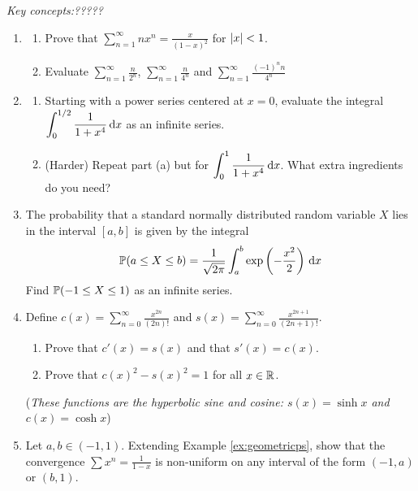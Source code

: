 \clearpage

\begin{exercises}
	\emph{Key concepts:\quad ?????}

	\begin{enumerate}
	  \item\begin{enumerate}
			\item Prove that $\displaystyle\sum_{n=1}^\infty nx^n=\frac x{(1-x)^2}$ for $\left| x\right|<1$.
	   	\item Evaluate $\displaystyle\sum_{n=1}^\infty\frac n{2^n}$, $\displaystyle\sum_{n=1}^\infty\frac{n}{4^n}$ and $\displaystyle\sum_{n=1}^\infty\frac{(-1)^nn}{4^n}$
	 \end{enumerate}
	 
	 \item\begin{enumerate}
	   \item Starting with a power series centered at $x=0$, evaluate the integral $\displaystyle\int_0^{1/2}\frac 1{1+x^4}\,{\mathrm{d} x}$ as an infinite series.
	   \item (Harder) Repeat part (a) but for $\displaystyle\int_0^{1}\frac 1{1+x^4}\,{\mathrm{d} x}$. What extra ingredients do you need? 
	 \end{enumerate}
	 
	 \item The probability that a standard normally distributed random variable $X$ lies in the interval $[a,b]$ is given by the integral
	 \[\mathbb{P}(a\le X\le b)=\frac 1{\sqrt{2\pi}}\int_a^b\exp\left(-\frac{x^2}2\right)\,{\mathrm{d} x}\]
	 Find $\mathbb{P}(-1\le X\le 1)$ as an infinite series.
	
	 \item Define $\displaystyle c(x)=\sum_{n=0}^\infty\frac{x^{2n}}{(2n)!}$ and $\displaystyle s(x)=\sum_{n=0}^\infty\frac{x^{2n+1}}{(2n+1)!}$.
	 \begin{enumerate}
	   \item Prove that $c'(x)=s(x)$ and that $s'(x)=c(x)$.
	   \item Prove that $c(x)^2-s(x)^2=1$ for all $x\in\mathbb{R}$.
	 \end{enumerate}
	 (\emph{These functions are the hyperbolic sine and cosine: $s(x)=\sinh x$ and $c(x)=\cosh x$})
	 
	 
		\item Let $a,b\in(-1,1)$. Extending Example \ref{ex:geometricps}, show that the convergence $\sum x^n=\frac 1{1-x}$ is non-uniform on any interval of the form $(-1,a)$ or $(b,1)$.
		

\end{enumerate}
\end{exercises}
